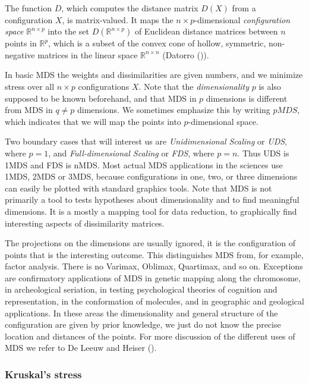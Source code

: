 \documentclass[
  12pt,
  letterpaper,
  DIV=11,
  numbers=noendperiod]{scrartcl}
\begin{document}
The function \(D\), which computes the distance matrix \(D(X)\) from a
configuration \(X\), is matrix-valued. It maps the
\(n\times p\)-dimensional \emph{configuration space}
\(\mathbb{R}^{n\times p}\) into the set \(D(\mathbb{R}^{n\times p})\) of
Euclidean distance matrices between \(n\) points in \(\mathbb{R}^p\),
which is a subset of the convex cone of hollow, symmetric, non-negative
matrices in the linear space \(\mathbb{R}^{n\times n}\) (Datorro
()).

In basic MDS the weights and dissimilarities are given numbers, and we
minimize stress over all \(n\times p\) configurations \(X\). Note that
the \emph{dimensionality} \(p\) is also supposed to be known beforehand,
and that MDS in \(p\) dimensions is different from MDS in \(q\not= p\)
dimensions. We sometimes emphasize this by writing \(pMDS\), which
indicates that we will map the points into \(p\)-dimensional space.

Two boundary cases that will interest us are \emph{Unidimensional
Scaling} or \emph{UDS}, where \(p=1\), and \emph{Full-dimensional
Scaling} or \emph{FDS}, where \(p=n\). Thus UDS is 1MDS and FDS is nMDS.
Most actual MDS applications in the sciences use 1MDS, 2MDS or 3MDS,
because configurations in one, two, or three dimensions can easily be
plotted with standard graphics tools. Note that MDS is not primarily a
tool to tests hypotheses about dimensionality and to find meaningful
dimensions. It is a mostly a mapping tool for data reduction, to
graphically find interesting aspects of dissimilarity matrices.

The projections on the dimensions are usually ignored, it is the
configuration of points that is the interesting outcome. This
distinguishes MDS from, for example, factor analysis. There is no
Varimax, Oblimax, Quartimax, and so on. Exceptions are confirmatory
applications of MDS in genetic mapping along the chromosome, in
archeological seriation, in testing psychological theories of cognition
and representation, in the conformation of molecules, and in geographic
and geological applications. In these areas the dimensionality and
general structure of the configuration are given by prior knowledge, we
just do not know the precise location and distances of the points. For
more discussion of the different uses of MDS we refer to De Leeuw and
Heiser ().

\subsubsection{Kruskal's stress}\label{kruskals-stress}
\end{document}
